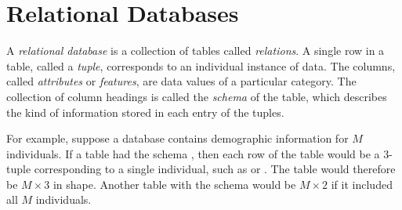 


\section*{Relational Databases} %

A \emph{relational database} is a collection of tables called \emph{relations}.
A single row in a table, called a \emph{tuple}, corresponds to an individual instance of data.
The columns, called \emph{attributes} or \emph{features}, are data values of a particular category.
The collection of column headings is called the \emph{schema} of the table, which describes the kind of information stored in each entry of the tuples.

For example, suppose a database contains demographic information for $M$ individuals.
If a table had the schema , then each row of the table would be a $3$-tuple corresponding to a single individual, such as  or .
The table would therefore be $M\times 3$ in shape.
Another table with the schema  would be $M \times 2$ if it included all $M$ individuals.

